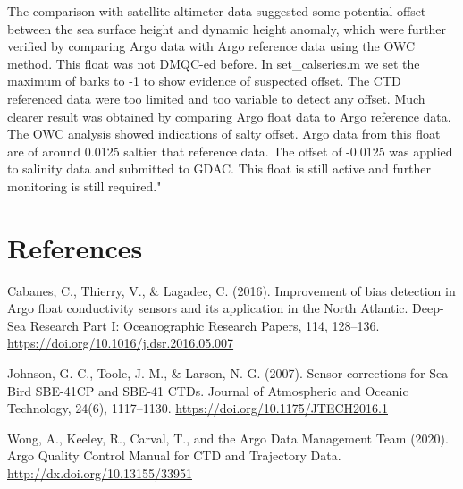 \documentclass{article}
\begin{document}
\begin{flushleft}
\medskip
The comparison with satellite altimeter data suggested some potential offset between the sea surface height and dynamic height anomaly, which were further verified by comparing Argo data with Argo reference data using the OWC method. This float was not DMQC-ed before. In set\_calseries.m we set the maximum of barks to -1 to show evidence of suspected offset. The CTD referenced data were too limited and too variable to detect any offset. Much clearer result was obtained by comparing Argo float data to Argo reference data. The OWC analysis showed indications of salty offset. Argo data from this float are of around 0.0125 saltier that reference data. The offset of -0.0125 was  applied to salinity data and submitted to GDAC. This float is still active and further monitoring is still required."


\section{References}

Cabanes, C., Thierry, V., \& Lagadec, C. (2016). Improvement of bias detection in Argo float conductivity sensors and its application in the North Atlantic. Deep-Sea Research Part I: Oceanographic Research Papers, 114, 128–136. \href{url}{https://doi.org/10.1016/j.dsr.2016.05.007}

\bigskip
Johnson, G. C., Toole, J. M., \& Larson, N. G. (2007). Sensor corrections for Sea-Bird SBE-41CP and SBE-41 CTDs. Journal of Atmospheric and Oceanic Technology, 24(6), 1117–1130. \href{url}{https://doi.org/10.1175/JTECH2016.1}

\bigskip
Wong, A., Keeley, R., Carval, T., and the Argo Data Management Team (2020).
Argo Quality Control Manual for CTD and Trajectory Data.
 \href{url}{http://dx.doi.org/10.13155/33951}

\end{flushleft}
\end{document}
